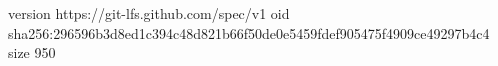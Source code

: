 version https://git-lfs.github.com/spec/v1
oid sha256:296596b3d8ed1c394c48d821b66f50de0e5459fdef905475f4909ce49297b4c4
size 950
